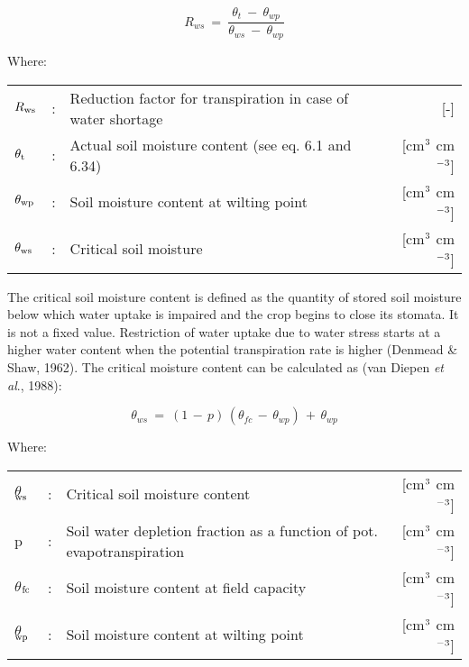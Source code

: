 \begin{equation}
R_{ws} ~=~{\frac{\theta  _{t} ~-~ \theta  _{wp} }{ \theta  _{ws} ~-~ \theta  _{wp} }}
\end{equation}

Where:\\
\begin{tabularx}{\textwidth}{llXr}
$R_{{\rm ws}}$ &:& Reduction factor for transpiration in case of
    water shortage & [-]\\
$\theta_{{\rm t}}$ &:& Actual soil moisture content (see eq. 6.1 and 
    6.34) & [cm$^{{\rm 3}}$ cm$^{{\rm -3}}$]\\
$\theta_{{\rm wp}}$ &:& Soil moisture content at wilting 
    point & [cm$^{{\rm 3}}$ cm$^{{\rm -3}}$]\\
$\theta_{{\rm ws}}$ &:& Critical soil moisture & [cm$^{{\rm 3}}$ cm$^{{\rm -3}}$]\\ 
\end{tabularx}

The critical soil moisture content is defined as the quantity of stored soil moisture below
which water uptake is impaired and the crop begins to close its stomata. It is not a fixed
value. Restriction of water uptake due to water stress starts at a higher water content
when the potential transpiration rate is higher (Denmead \& Shaw, 1962). The critical
moisture content can be calculated as (van Diepen {\it et al\/}., 1988):

\begin{equation}
\theta_{ws} ~=~ (1\, -\, p )\, (\theta  _{fc} \, -\, \theta  _{wp} )\, +\, \theta  _{wp} 
\end{equation}

Where:\\
\begin{tabularx}{\textwidth}{llXr}
$\theta$$_{{\rm ws}}$ &:& Critical soil moisture content & [cm$^{{\rm 3}}$ cm$^{{\rm -3}}$]\\
p &:& Soil water depletion fraction as a function 
     of pot. evapotranspiration & [cm$^{{\rm 3}}$ cm$^{{\rm -3}}$]\\
$\theta$$_{{\rm fc}}$ &:& Soil moisture content at field capacity & [cm$^{{\rm 3}}$ cm$^{{\rm -3}}$]\\
$\theta$$_{{\rm wp}}$ &:& Soil moisture content at wilting point & [cm$^{{\rm 3}}$ cm$^{{\rm -3}}$]\\
\end{tabularx}

